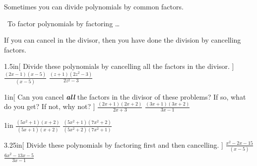 Sometimes you can divide polynomials by  common factors.

\begin{myConceptSteps}{~To factor polynomials by factoring \dots}
\end{myConceptSteps}

If you can cancel  in the divisor,
then you have done the division by cancelling factors.

\begin{my2Problems}[\large]{1.5in}[
    Divide these polynomials by cancelling all the factors in the divisor.
    ]
    {
        $\frac{(2x-1)(x-5)}{(x-5)}$
    }
    {
        $\frac{(z+1)(2z^2 - 3)}{2z^2-3}$
    }
\end{my2Problems}

\begin{my2Problems}[\large]{1in}[
    Can you cancel {\bfseries\itshape all} the factors in the divisor of these problems?
    If so, what do you get? If not, why not?
    ]
    {
        $\frac{(2x+1)(2x+2)}{2x+3}$
    }
    {
        $\frac{(3x+1)(3x+2)}{3x-1}$
    }
\end{my2Problems}
\begin{my2Problems}[\large]{1in}
    {
        $\frac{(5x^2+1)(x+2)}{(5x+1)(x+2)}$
    }
    {
        $\frac{(5x^2+1)(7x^2+2)}{(5x^2+2)(7x^2+1)}$
    }
\end{my2Problems}


\begin{my2Problems}[\large]{3.25in}[
    Divide these polynomials by factoring first and then cancelling.
    ]
    {
        $\frac{x^2 -2x - 15}{(x-5)}$
    }
    {
        $\frac{6x^2 - 13x - 5}{3x-1}$
    }
\end{my2Problems}


